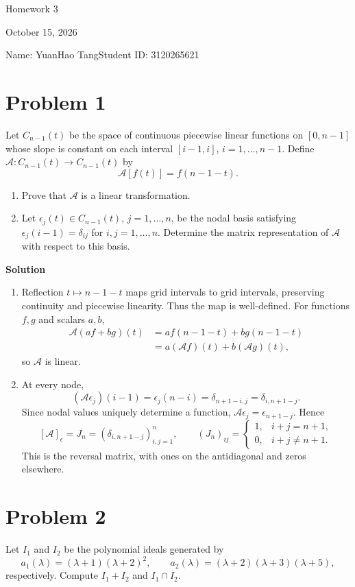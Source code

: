 \documentclass[UTF8,10pt,letterpaper,fontset=fandol]{ctexart}
\newcommand{\Solution}{\par\Needspace{4\baselineskip}\textbf{Solution}\par}
\begin{document}
\begin{center}
{\LARGE Homework 3}\par
\vspace{0.6em}
October 15, 2026\par
Name: YuanHao Tang\quad Student ID: 3120265621
\end{center}

\section{Problem 1}
Let \(C_{n-1}(t)\) be the space of continuous piecewise linear functions on \([0,n-1]\)
whose slope is constant on each interval \([i-1,i]\), \(i=1,\ldots,n-1\).
Define \(\mathcal A:C_{n-1}(t)\to C_{n-1}(t)\) by
\[
\mathcal A[f(t)]=f(n-1-t).
\]
\begin{enumerate}
\item Prove that \(\mathcal A\) is a linear transformation.
\item Let \(\epsilon_j(t)\in C_{n-1}(t)\), \(j=1,\ldots,n\), be the nodal basis satisfying
\(\epsilon_j(i-1)=\delta_{ij}\) for \(i,j=1,\ldots,n\).
Determine the matrix representation of \(\mathcal A\) with respect to this basis.
\end{enumerate}

\Solution
\begin{enumerate}
\item Reflection \(t\mapsto n-1-t\) maps grid intervals to grid intervals, preserving continuity
and piecewise linearity. Thus the map is well-defined. For functions \(f,g\) and scalars \(a,b\),
\[
\begin{aligned}
\mathcal A(af+bg)(t)&=a f(n-1-t)+b g(n-1-t)\\
&=a(\mathcal Af)(t)+b(\mathcal Ag)(t),
\end{aligned}
\]
so \(\mathcal A\) is linear.
\item At every node,
\[
(\mathcal A\epsilon_j)(i-1)=\epsilon_j(n-i)=\delta_{n+1-i,j}=\delta_{i,n+1-j}.
\]
Since nodal values uniquely determine a function, \(\mathcal A\epsilon_j=\epsilon_{n+1-j}\). Hence
\[
\boxed{[\mathcal A]_{\epsilon}=J_n=(\delta_{i,n+1-j})_{i,j=1}^n},\qquad
(J_n)_{ij}=\begin{cases}1,&i+j=n+1,\\0,&i+j\ne n+1.\end{cases}
\]
This is the reversal matrix, with ones on the antidiagonal and zeros elsewhere.
\end{enumerate}

\section{Problem 2}
Let \(I_1\) and \(I_2\) be the polynomial ideals generated by
\[
a_1(\lambda)=(\lambda+1)(\lambda+2)^2,\qquad
a_2(\lambda)=(\lambda+2)(\lambda+3)(\lambda+5),
\]
respectively. Compute \(I_1+I_2\) and \(I_1\cap I_2\).
\end{document}
